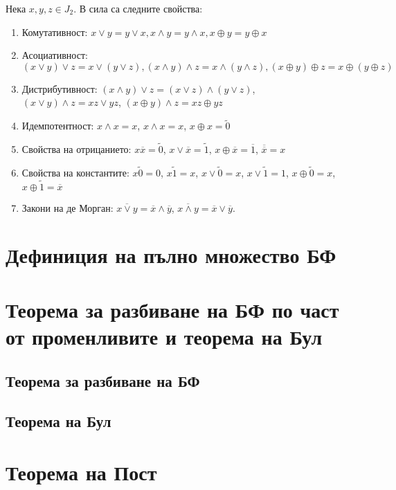 \documentclass[fleqn,12pt]{article}
\begin{document}
\begin{flushleft}
Нека $x,y,z \in J_2$. В сила са следните свойства:
\begin{enumerate}
    \item Комутативност: $x \vee y = y \vee x, x \wedge y = y \wedge x, x \oplus y = y \oplus x$
    \item Асоциативност: $(x \vee y) \vee z = x \vee (y \vee z), (x \wedge y) \wedge z = x \wedge (y \wedge z), (x \oplus y) \oplus z = x \oplus (y \oplus z)$
    \item Дистрибутивност: $(x \wedge y) \vee z = (x \vee z) \wedge (y \vee z)$, $(x \vee y) \wedge z = xz \vee yz$, $(x \oplus y) \wedge z = xz \oplus yz$
    \item Идемпотентност: $x \wedge x = x$, $x \wedge x = x$, $x \oplus x = \widetilde{0}$
    \item Свойства на отрицанието: $x\overline{x} = \widetilde{0}$, $x \vee \overline{x} = \widetilde{1}$, $x \oplus \overline{x} = \overline{1}$, $\overline{\overline{{x}}} = x$
    \item Свойства на константите: $x\widetilde{0} = 0$, $x\widetilde{1} = x$, $x\vee \widetilde{0} = x$, $x \vee \widetilde{1} = 1$, $x \oplus \widetilde{0} = x$, $x \oplus \widetilde{1} = \overline{x}$
    \item Закони на де Морган: $\overline{x \vee y} = \overline{x} \wedge \overline{y}$, $\overline{x \wedge y} = \overline{x} \vee \overline{y}$.  
\end{enumerate}


\section{Дефиниция на пълно множество БФ}

\section{Теорема за разбиване на БФ по част от променливите и теорема на Бул}

\subsection{Теорема за разбиване на БФ}

\subsection{Теорема на Бул}

\section{Теорема на Пост}


\end{flushleft}
\end{document}
